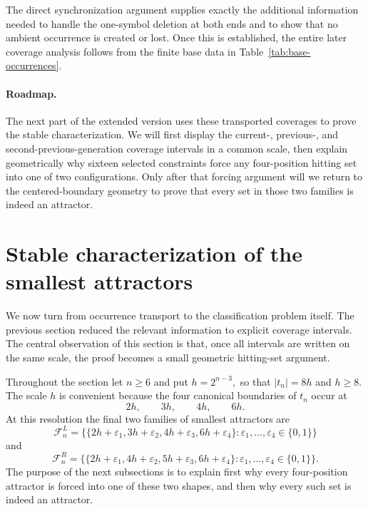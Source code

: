\documentclass[10pt,a4paper]{article}
\theoremstyle{definition}\newtheorem{definition}[theorem]{Definition}
\theoremstyle{remark}\newtheorem{remark}[theorem]{Remark}
\newcommand{\FL}{\mathcal{F}^{L}}
\newcommand{\FR}{\mathcal{F}^{R}}
\begin{document}
The direct synchronization argument supplies exactly the additional information needed to handle the one-symbol deletion at both ends and to show that no ambient occurrence is created or lost. Once this is established, the entire later coverage analysis follows from the finite base data in Table~\ref{tab:base-occurrences}.

\paragraph{Roadmap.}
The next part of the extended version uses these transported coverages to prove the stable characterization. We will first display the current-, previous-, and second-previous-generation coverage intervals in a common scale, then explain geometrically why sixteen selected constraints force any four-position hitting set into one of two configurations. Only after that forcing argument will we return to the centered-boundary geometry to prove that every set in those two families is indeed an attractor.




\section{Stable characterization of the smallest attractors}
\label{sec:stable-characterization}

We now turn from occurrence transport to the classification problem itself.  The previous section reduced the relevant information to explicit coverage intervals.  The central observation of this section is that, once all intervals are written on the same scale, the proof becomes a small geometric hitting-set argument.

Throughout the section let $n\ge6$ and put
$
 h=2^{n-3},
$
so that $|t_n|=8h$ and $h\ge8$.  The scale $h$ is convenient because the four canonical boundaries of $t_n$ occur at
\[
 2h,\qquad 3h,\qquad 4h,\qquad 6h.
\]
At this resolution the final two families of smallest attractors are
\[
\FL_n=
\bigl\{\{2h+\varepsilon_1,3h+\varepsilon_2,4h+\varepsilon_3,6h+\varepsilon_4\}:
\varepsilon_1,\ldots,\varepsilon_4\in\{0,1\}\bigr\}
\]
and
\[
\FR_n=
\bigl\{\{2h+\varepsilon_1,4h+\varepsilon_2,5h+\varepsilon_3,6h+\varepsilon_4\}:
\varepsilon_1,\ldots,\varepsilon_4\in\{0,1\}\bigr\}.
\]
The purpose of the next subsections is to explain first why every four-position attractor is forced into one of these two shapes, and then why every such set is indeed an attractor.
\end{document}
